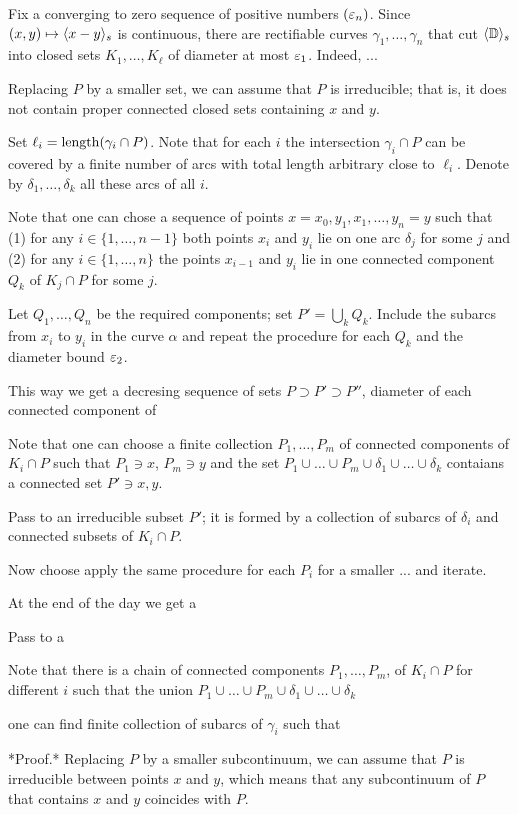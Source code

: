 Fix a converging to zero sequence of positive numbers $(\varepsilon_n)$. 
Since $(x,y)\mapsto\langle x-y\rangle_{s}$ is continuous, 
there are rectifiable curves $\gamma_1,\dots,\gamma_n$ that cut $\langle\mathbb{D}\rangle_s$ into closed sets $K_1,\dots,K_\ell$ of diameter at most $\varepsilon_1$.
Indeed, ...

Replacing $P$ by a smaller set, we can assume that $P$ is irreducible; that is, it does not contain proper connected closed sets containing $x$ and $y$.

Set $\ell_i=\mathop{\rm length}\nolimits(\gamma_i\cap P)$.
Note that for each $i$ the intersection $\gamma_i\cap P$ can be covered by a finite number of arcs with total length arbitrary close to $\ell_i$.
Denote by $\delta_1,\dots,\delta_k$ all these arcs of all $i$.

Note that one can chose a sequence of points $x=x_0,y_1,x_1,\dots,y_n=y$
such that 
(1) for any $i\in\{1,\dots,n-1\}$ both points $x_i$ and $y_i$ lie on one arc $\delta_j$ for some $j$ 
and 
(2) for any $i\in\{1,\dots,n\}$ the points $x_{i-1}$ and $y_i$ lie in one connected component $Q_k$ of $K_j\cap P$ for some $j$.

Let  $Q_1, \dots, Q_n$ be the required components; 
set $P'=\bigcup_k Q_k$. 
Include the subarcs from $x_i$ to $y_i$ in the curve $\alpha$ and repeat the procedure for each $Q_k$ and the diameter bound $\varepsilon_2$.

This way we get a decresing sequence of sets $P\supset P'\supset P''$,
diameter of each connected component of 


Note that one can choose a finite collection $P_1,\dots,P_m$ of connected components of $K_i\cap P$ such that $P_1\ni x$, $P_m\ni y$
and the set $P_1\cup\dots\cup P_m\cup\delta_1\cup\dots\cup\delta_k$ contaians a connected set $P'\ni x,y$.

Pass to an irreducible subset $P'$; it is formed by a collection of subarcs of $\delta_i$ and connected subsets of $K_i\cap P$.

Now choose apply the same procedure for each $P_i$ for a smaller ...
and iterate.

At the end of the day we get a 

Pass to a 

Note that there is a chain of connected components $P_1,\dots,P_m$, of $K_i\cap P$ for different $i$ such that the union $P_1\cup\dots\cup P_m\cup\delta_1\cup\dots\cup\delta_k$ 

one can find finite collection of subarcs of $\gamma_i$ such that

*Proof.* Replacing $P$ by a smaller subcontinuum, we can assume that $P$ is irreducible between points $x$ and $y$, which means that any subcontinuum of $P$ that contains $x$ and $y$ coincides with $P$. 

